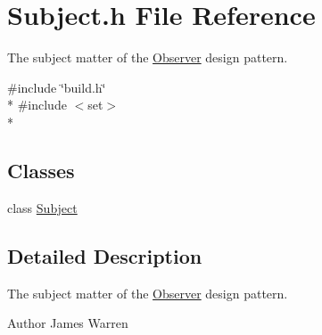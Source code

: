 \section{Subject.\-h File Reference}
\label{_subject_8h}


The subject matter of the \hyperlink{class_observer}{Observer} design pattern.  


{\ttfamily \#include \char`\"{}build.\-h\char`\"{}}\\*
{\ttfamily \#include $<$set$>$}\\*
\subsection*{Classes}
\begin{DoxyCompactItemize}
\item 
class \hyperlink{class_subject}{Subject}
\end{DoxyCompactItemize}


\subsection{Detailed Description}
The subject matter of the \hyperlink{class_observer}{Observer} design pattern. \begin{DoxyAuthor}{Author}
James Warren 
\end{DoxyAuthor}
